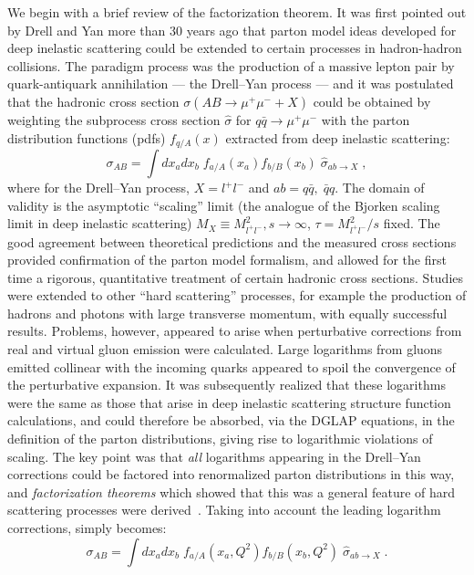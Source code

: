 \documentclass[12pt]{iopart}
\def\sighat{\hat{\sigma}}
\def\qq{q \bar{q}}
\begin{document}
We begin with a brief review of the factorization theorem. It was first pointed out by Drell and Yan
\cite{DRELL}  more than 30 years ago that parton model ideas developed for deep inelastic scattering could be
extended to certain processes in hadron-hadron collisions. The paradigm process was the production of a massive
lepton pair by quark-antiquark annihilation --- the Drell--Yan process --- and it was postulated that the
hadronic cross section $\sigma(AB \to \mu^+\mu^- + X)$ could be obtained by weighting the subprocess cross
section $\sighat$ for $\qq\rightarrow\mu^+\mu^-$ with the parton distribution functions (pdfs) $f_{q/A}(x)$ extracted
from deep inelastic scattering:
\begin{equation}
\sigma_{AB} = \int dx_a dx_b\; f_{a/A}(x_a) f_{b/B}(x_b)\;
\sighat_{ab\to X}\; ,
\label{siglo}
\end{equation}
where for the Drell--Yan process, $X=l^+l^-$ and $ab = q\bar{q},\;
\bar{q}q$.
The domain of  validity is  the asymptotic ``scaling'' limit
(the analogue of the Bjorken scaling limit in deep inelastic scattering)
$M_X \equiv M_{l^+l^-}^2, s \to
\infty$, $\tau = M_{l^+l^-}^2/s$ fixed.    The good agreement  between
theoretical predictions and the measured cross sections provided
confirmation of the parton model formalism, and allowed for the first
time a rigorous, quantitative treatment of certain hadronic cross sections.
Studies were extended to other ``hard scattering'' processes, for
example the production of hadrons and photons with large transverse momentum,
with equally successful results. Problems, however,
appeared to arise when perturbative corrections
from real and virtual gluon emission were calculated. Large
logarithms from gluons emitted collinear with the incoming quarks
appeared to spoil the convergence of the perturbative expansion.
It was subsequently  realized that these logarithms were the same as those
that arise in deep inelastic scattering structure function
calculations,
and could therefore be absorbed, via the DGLAP
equations, in the definition of the
parton distributions, giving rise to logarithmic violations of
scaling. The key point was that {\it all} logarithms appearing in the Drell--Yan
corrections could be factored into renormalized parton distributions
in this way, and {\it factorization theorems} which showed that this
was a general feature of hard scattering processes were
derived~\cite{FACT}. Taking into account the leading logarithm corrections,  simply becomes:
\begin{equation}
\sigma_{AB} = \int dx_a dx_b\; f_{a/A}(x_a,Q^2) f_{b/B}(x_b,Q^2)\;
\sighat_{ab\to X}\; .
\label{sigll}
\end{equation}
\end{document}
